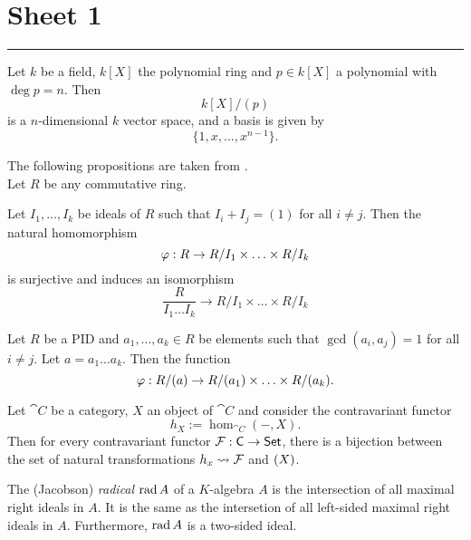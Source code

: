 \section{Sheet 1}

\hrule
\begin{prop}
Let $k$ be a field, $k[X]$ the polynomial ring and $p\in k[X]$ a polynomial with $\deg p=n$. Then
	\[
	k[X]/(p)
	\]
is a $n$-dimensional $k$ vector space, and a basis is given by
	\[
	\{1,x,...,x^{n-1}\}.
	\]
\end{prop}
The following propositions are taken from \cite{aluffi}.\\
Let $R$ be any commutative ring.
\begin{prop}
  Let $I_1,...,I_k$ be ideals of $R$ such that $I_i+I_j=(1)$ for all $i\neq j$. Then the natural homomorphism
  \[
  \varphi :R\to R/I_1\times \hdots \times R/I_k
  \]
  is surjective and induces an isomorphism
  \[
  \frac{R}{I_1\hdots I_k}\to R/I_1\times \hdots \times R/I_k
  \]
\end{prop}
\begin{cor}
  Let $R$ be a PID and $a_1,...,a_k\in R$ be elements such that $\gcd(a_i,a_j)=1$ for all $i\neq j$. Let $a=a_1\hdots a_k$. Then the function
  \[
  \varphi: R/(a)\to R/(a_1)\times \hdots \times R/(a_k).
  \]
\end{cor}
\begin{prop}
	Let $\cat{C}$ be a category, $X$ an object of $\cat{C}$ and consider the contravariant functor
	\[
	h_X:= \hom_{\cat{C}}(-,X).
	\]
	Then for every contravariant functor $\mathcal{F}:\mathsf{C}\to \mathsf{Set}$, there is a bijection between the set of natural transformations $h_x\leadsto\mathcal{F}$ and $\mathcal{(}X)$.
\end{prop}
\begin{defn}
	The (Jacobson) \emph{radical} $\operatorname{rad} A$ of a $K$-algebra $A$ is the intersection of all maximal right ideals in $A$. It is the same as the intersetion of all left-sided maximal right ideals in $A$. Furthermore, $\operatorname{rad} A$ is a two-sided ideal.
\end{defn}
